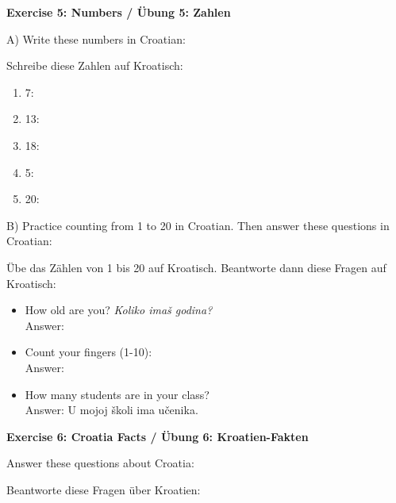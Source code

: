 \begin{exercise}
\textbf{Exercise 5: Numbers / Übung 5: Zahlen}

A) Write these numbers in Croatian:

Schreibe diese Zahlen auf Kroatisch:

\begin{enumerate}
    \item 7: \underline{\hspace{4cm}}
    \item 13: \underline{\hspace{4cm}}
    \item 18: \underline{\hspace{4cm}}
    \item 5: \underline{\hspace{4cm}}
    \item 20: \underline{\hspace{4cm}}
\end{enumerate}

B) Practice counting from 1 to 20 in Croatian. Then answer these questions in Croatian:

Übe das Zählen von 1 bis 20 auf Kroatisch. Beantworte dann diese Fragen auf Kroatisch:

\begin{itemize}
    \item How old are you? \textit{Koliko imaš godina?} \\
    Answer: \underline{\hspace{8cm}}
    
    \item Count your fingers (1-10): \\
    Answer: \underline{\hspace{8cm}}
    
    \item How many students are in your class? \\
    Answer: U mojoj školi ima \underline{\hspace{4cm}} učenika.
\end{itemize}

\vspace{2cm}

\textbf{Exercise 6: Croatia Facts / Übung 6: Kroatien-Fakten}

Answer these questions about Croatia:

Beantworte diese Fragen über Kroatien:


\end{exercise}
